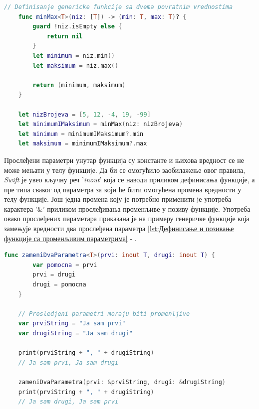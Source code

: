 \documentclass[12pt,oneside]{memoir}
\begin{document}
\begin{lstlisting}[caption=\textit{{Дефинисање и позивање функције са више повратних вредности}}, label={lst:Дефинисање и позивање функције са више повратних вредности}, language=Swift, frame=single]
    // Definisanje genericke funkcije sa dvema povratnim vrednostima
    func minMax<T>(niz: [T]) -> (min: T, max: T)? {
        guard !niz.isEmpty else {
            return nil
        }
        let minimum = niz.min()
        let maksimum = niz.max()
        
        return (minimum, maksimum)
    }
    
    let nizBrojeva = [5, 12, -4, 19, -99]
    let minimumIMaksimum = minMax(niz: nizBrojeva)
    let minimum = minimumIMaksimum?.min
    let maksimum = minimumIMaksimum?.max
\end{lstlisting}

\indent Прослеђени параметри унутар функција су константе и њихова вредност се не може мењати у телу функције. Да би се омогућило заобилажење овог правила, \textit{Swift} је увео кључну реч '\textit{inout}' која се наводи приликом дефинисања функције, а пре типа сваког од параметра за који ће бити омогућена промена вредности у телу функције. Још једна промена коју је потребно применити је употреба карактера '\&' приликом прослеђивања променљиве у позиву функције. Употреба овако прослеђених параметара приказана је на примеру генеричке функције која замењује вредности два прослеђена параметра \ref{lst:Дефинисање и позивање функције са променљивим параметрима} - . 

\begin{lstlisting}[caption=\textit{{Дефинисање и позивање функције са променљивим параметрима}}, label={lst:Дефинисање и позивање функције са променљивим параметрима}, language=Swift, frame=single]
    func zameniDvaParametra<T>(prvi: inout T, drugi: inout T) {
        var pomocna = prvi
        prvi = drugi
        drugi = pomocna
    }
    
    // Prosledjeni parametri moraju biti promenljive
    var prviString = "Ja sam prvi"
    var drugiString = "Ja sam drugi"
    
    print(prviString + ", " + drugiString)
    // Ja sam prvi, Ja sam drugi
    
    zameniDvaParametra(prvi: &prviString, drugi: &drugiString)
    print(prviString + ", " + drugiString)
    // Ja sam drugi, Ja sam prvi
    
\end{lstlisting}
\end{document}
